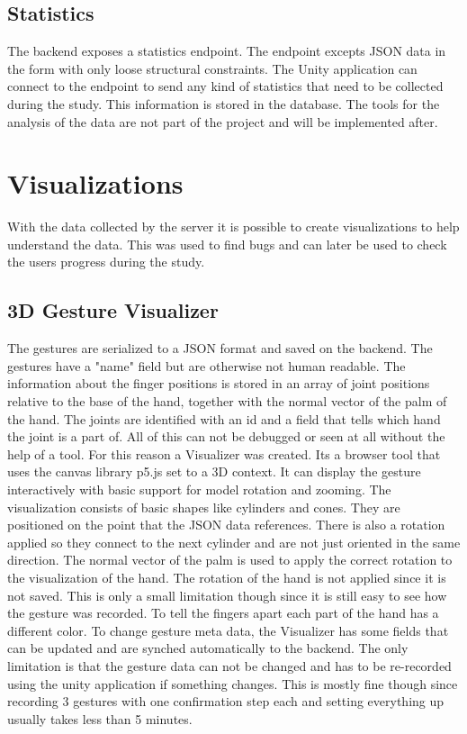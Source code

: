 \subsection{Statistics}
The backend exposes a statistics endpoint. The endpoint excepts JSON data in the form with only loose structural constraints. The Unity application can connect to the endpoint to send any kind of statistics that need to be collected during the study. This information is stored in the database. The tools for the analysis of the data are not part of the project and will be implemented after.  


\section{Visualizations}
With the data collected by the server it is possible to create visualizations to help understand the data. This was used to find bugs and can later be used to check the users progress during the study.

\subsection{3D Gesture Visualizer}
The gestures are serialized to a JSON format and saved on the backend. The gestures have a "name" field but are otherwise not human readable. The information about the finger positions is stored in an array of joint positions relative to the base of the hand, together with the normal vector of the palm of the hand. The joints are identified with an id and a field that tells which hand the joint is a part of. All of this can not be debugged or seen at all without the help of a tool. For this reason a Visualizer was created. Its a browser tool that uses the canvas library p5.js set to a 3D context. It can display the gesture interactively with basic support for model rotation and zooming. The visualization consists of basic shapes like cylinders and cones. They are positioned on the point that the JSON data references. There is also a rotation applied so they connect to the next cylinder and are not just oriented in the same direction. The normal vector of the palm is used to apply the correct rotation to the visualization of the hand. The rotation of the hand is not applied since it is not saved. This is only a small limitation though since it is still easy to see how the gesture was recorded. To tell the fingers apart each part of the hand has a different color. To change gesture meta data, the Visualizer has some fields that can be updated and are synched automatically to the backend. The only limitation is that the gesture data can not be changed and has to be re-recorded using the unity application if something changes. This is mostly fine though since recording 3 gestures with one confirmation step each and setting everything up usually takes less than 5 minutes.



